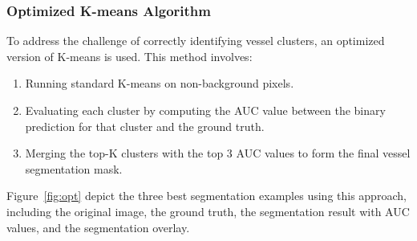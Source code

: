 \documentclass[12pt,letterpaper]{article}
\begin{document}
\subsubsection{Optimized K-means Algorithm}
To address the challenge of correctly identifying vessel clusters, an optimized version of K-means is used. This method involves:
\begin{enumerate}
    \item Running standard K-means on non-background pixels.
    \item Evaluating each cluster by computing the AUC value between the binary prediction for that cluster and the ground truth.
    \item Merging the top-K clusters with the top 3 AUC values to form the final vessel segmentation mask.
\end{enumerate}
Figure~\ref{fig:opt} depict the three best segmentation examples using this approach, including the original image, the ground truth, the segmentation result with AUC values, and the segmentation overlay. 
\end{document}
